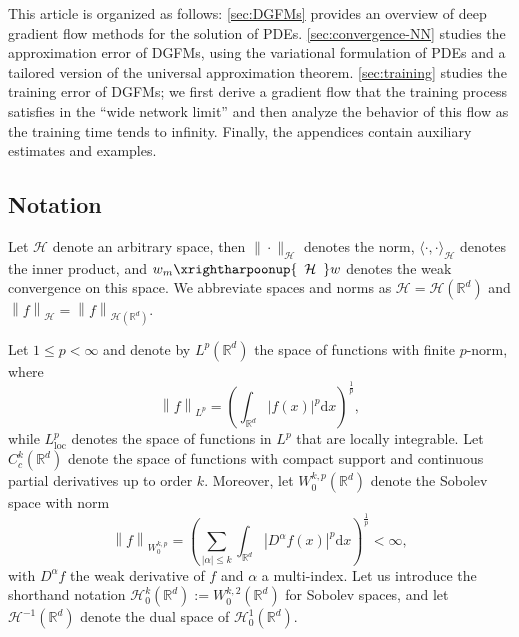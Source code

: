 \documentclass[11pt,a4paper,reqno]{amsart}
\numberwithin{equation}{section}
\theoremstyle{plain}
\theoremstyle{definition}
\def\ud{\mathrm d}
\newcommand{\cH}{\mathcal{H}}
\newcommand{\R}{\mathbb{R}}
\newcommand{\norm}[1]{\left\|#1 \right\|} %
\newcommand{\abs}[1]{\left|#1\right|} %
\begin{document}
This article is organized as follows: 
\cref{sec:DGFMs} provides an overview of deep gradient flow methods for the solution of PDEs.
\cref{sec:convergence-NN} studies the approximation error of DGFMs, using the variational formulation of PDEs and a tailored version of the universal approximation theorem. 
\cref{sec:training} studies the training error of DGFMs; we first derive a gradient flow that the training process satisfies in the ``wide network limit'' and then analyze the behavior of this flow as the training time tends to infinity.
Finally, the appendices contain auxiliary estimates and examples.


\subsection{Notation}
Let $\cH$ denote an arbitrary space, then $\|\cdot\|_\mathcal{H}$ denotes the norm, $\langle\cdot,\cdot\rangle_\mathcal{H}$ denotes the inner product, and  $w_m \xrightharpoonup{\,\,\, \mathcal H \,\,\,} w$ denotes the weak convergence on this space.
We abbreviate spaces and norms as $\cH = \cH(\R^d)$ and $\norm{f}_{\cH} = \norm{f}_{\cH (\R^d)}$.

Let $1 \leq p < \infty$ and denote by $L^p (\R^d)$ the space of functions with finite $p$-norm, where
\[
\norm{f}_{L^p} = \left( \int_{\R^d} \abs{f (x)}^p \ud x \right)^{\frac{1}{p}},
\]
while $L^p_{\text{loc}}$ denotes the space of functions in $L^p$ that are locally integrable.
Let $C_c^k \left( \mathbb{R}^d \right)$ denote the space of functions with compact support and continuous partial derivatives up to order $k$.
Moreover, let  $W_0^{k, p} (\R^d)$ denote the Sobolev space with norm
\[
\norm{f}_{W_0^{k, p}} = \left( \sum_{\abs{\alpha} \leq k} \int_{\R^d} \abs{D^\alpha f (x)}^p \ud x \right)^{\frac{1}{p}} < \infty,
\]
with $D^{\alpha} f$ the weak derivative of $f$ and $\alpha$ a multi-index.
Let us introduce the shorthand notation $\cH_0^k (\R^d) := W_0^{k, 2} (\R^d)$ for Sobolev spaces, and let $\cH^{-1}(\R^d)$ denote the dual space of $\cH_0^1(\R^d)$.
\end{document}
